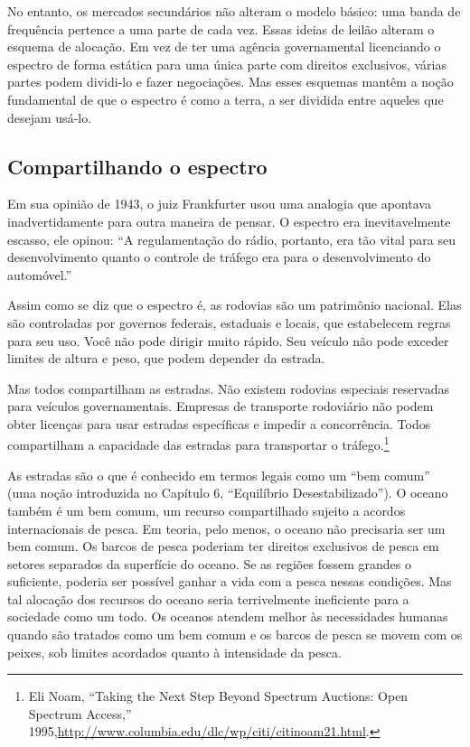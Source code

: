 \documentclass{book}
\begin{document}
No entanto, os mercados secundários não alteram o modelo básico: uma banda de
frequência pertence a uma parte de cada vez. Essas ideias de leilão alteram o
esquema de alocação. Em vez de ter uma agência governamental licenciando o
espectro de forma estática para uma única parte com direitos exclusivos, várias
partes podem dividi-lo e fazer negociações. Mas esses esquemas mantêm a noção
fundamental de que o espectro é como a terra, a ser dividida entre aqueles que
desejam usá-lo.

\subsection{Compartilhando o espectro}
\label{cap8:os-caminho-compartilhando}
Em sua opinião de 1943, o juiz Frankfurter usou uma analogia que apontava
inadvertidamente para outra maneira de pensar. O espectro era inevitavelmente
escasso, ele opinou: ``A regulamentação do rádio, portanto, era tão vital para
seu desenvolvimento quanto o controle de tráfego era para o desenvolvimento do
automóvel.''

Assim como se diz que o espectro é, as rodovias são um patrimônio nacional. Elas
são controladas por governos federais, estaduais e locais, que estabelecem regras
para seu uso. Você não pode dirigir muito rápido. Seu veículo não pode exceder
limites de altura e peso, que podem depender da estrada.

Mas todos compartilham as estradas. Não existem rodovias especiais reservadas
para veículos governamentais. Empresas de transporte rodoviário não podem obter
licenças para usar estradas específicas e impedir a concorrência. Todos
compartilham a capacidade das estradas para transportar o 
tráfego.\footnote{Eli Noam, ``Taking the Next Step Beyond Spectrum Auctions: Open
Spectrum Access,'' 1995,\url{http://www.columbia.edu/dlc/wp/citi/citinoam21.html}.}

As estradas são o que é conhecido em termos legais como um ``bem comum'' (uma
noção introduzida no Capítulo 6, ``Equilíbrio Desestabilizado''). O oceano também
é um bem comum, um recurso compartilhado sujeito a acordos internacionais de
pesca. Em teoria, pelo menos, o oceano não precisaria ser um bem comum. Os barcos
de pesca poderiam ter direitos exclusivos de pesca em setores separados da
superfície do oceano. Se as regiões fossem grandes o suficiente, poderia ser
possível ganhar a vida com a pesca nessas condições. Mas tal alocação dos
recursos do oceano seria terrivelmente ineficiente para a sociedade como um todo.
Os oceanos atendem melhor às necessidades humanas quando são tratados como um bem
comum e os barcos de pesca se movem com os peixes, sob limites acordados quanto
à intensidade da pesca.\\
\end{document}
